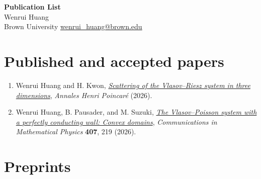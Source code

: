 \documentclass[11pt]{article}
\begin{document}
 
\begin{center}
    {\Large\bfseries Publication List}\\[0.35em]
    {\large Wenrui Huang}\\[0.15em]
    Brown University \quad
    \href{mailto:wenrui_huang@brown.edu}{wenrui\_huang@brown.edu}
\end{center}
 
\section{Published and accepted papers}
 
\begin{enumerate}
    \item Wenrui Huang and H. Kwon,
    \href{https://link.springer.com/article/10.1007/s00023-026-01735-7}
    {\emph{Scattering of the Vlasov--Riesz system in three dimensions}},
    \emph{Annales Henri Poincar\'e} (2026).
 
    \item Wenrui Huang, B. Pausader, and M. Suzuki,
    \href{https://link.springer.com/article/10.1007/s00220-026-05731-0}
    {\emph{The Vlasov--Poisson system with a perfectly conducting wall:
    Convex domains}},
    \emph{Communications in Mathematical Physics} \textbf{407}, 219 (2026).
\end{enumerate}
 
\section{Preprints}
 
\end{document}
